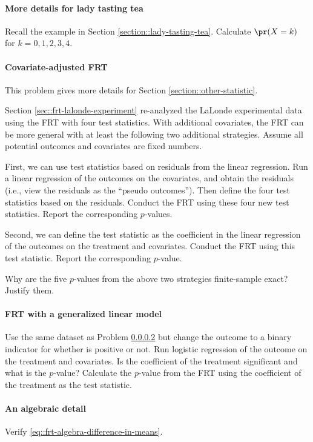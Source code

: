 \paragraph{More details for lady tasting tea}
\label{hw::more-tea}

Recall the example in Section \ref{section::lady-tasting-tea}. Calculate $\pr(X=k)$ for $k=0,1,2,3,4$. 


\paragraph{Covariate-adjusted FRT}
\label{hw::frt-covariates}


This problem gives more details for Section \ref{section::other-statistic}.  


Section \ref{sec::frt-lalonde-experiment} re-analyzed the LaLonde experimental data using the FRT with four test statistics. With additional covariates, the FRT can be more general with at least the following two additional strategies. Assume all potential outcomes and covariates are fixed numbers. 

First, we can use test statistics based on residuals from the linear regression. Run a linear regression of the outcomes on the covariates, and obtain the residuals (i.e., view the residuals as the ``pseudo outcomes''). Then define the four test statistics based on the residuals. Conduct the FRT using these four new test statistics. Report the corresponding $p$-values.


Second, we can define the test statistic as the coefficient in the linear regression of the outcomes on the treatment and covariates. Conduct the FRT using this test statistic. Report the corresponding $p$-value. 


Why are the five $p$-values from the above two strategies finite-sample exact? Justify them. 



\paragraph{FRT with a generalized linear model}
\label{hw::frt-glm}


Use the same dataset as Problem \ref{hw::frt-covariates} but change the outcome to a binary indicator for whether  is positive or not. Run logistic regression of the outcome on the treatment and covariates. Is the coefficient of the treatment significant and what is the $p$-value? Calculate the $p$-value from the FRT using the coefficient of the treatment as the test statistic. 




\paragraph{An algebraic detail}
\label{hw::frt-algebraic-detail}

Verify \eqref{eq::frt-algebra-difference-in-means}. 

